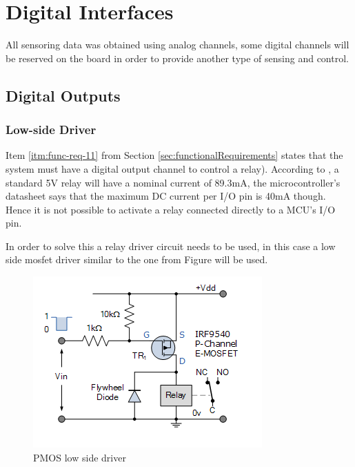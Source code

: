 \section{Digital Interfaces}\label{sec:digital-interfaces}

	All sensoring data was obtained using analog channels, some digital channels will be reserved on the board in order to provide another type of sensing and control.

	\subsection{Digital Outputs}\label{ssec:digital-outputs}

		\subsubsection{Low-side Driver}\label{sssec:digital-outputs-low-side-driver}

			Item \ref{itm:func-req-11} from Section \ref{sec:functionalRequirements} states that the system must have a digital output channel to control a relay). According to \cite{songle-relay-datasheet}, a standard 5V relay will have a nominal current of 89.3mA, the microcontroller's datasheet \cite{atmega32u4-datasheet} says that the maximum DC current per I/O pin is 40mA though. Hence it is not possible to activate a relay connected directly to a MCU's I/O pin.
			\par 
			In order to solve this a relay driver circuit needs to be used, in this case a low side mosfet driver similar to the one from Figure \cite{pmos-low-side-driver} will be used.

			\begin{figure}[htbp]
				\centering
				\includegraphics[width=.8\textwidth]{figuras/fig-pmos-low-side-driver.png}
				\caption{PMOS low side driver \cite{pmos-low-side-driver}}
				\label{fig:pmos-low-side-driver}
			\end{figure}

